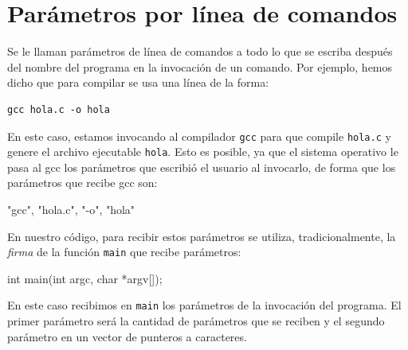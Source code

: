
%

\renewcommand{\chaptermark}[1]{\markboth{#1}{}}
\renewcommand{\thesection}{\arabic{section}}
\chapter*{Parámetros por línea de comandos}

Se le llaman parámetros de línea de comandos a todo lo que se escriba después
del nombre del programa en la invocación de un comando. Por ejemplo, hemos
dicho que para compilar se usa una línea de la forma:

\begin{verbatim}
gcc hola.c -o hola
\end{verbatim}

En este caso, estamos invocando al compilador \verb!gcc! para que compile
\verb!hola.c! y genere el archivo ejecutable \verb!hola!. Esto es posible,
ya que el sistema operativo le pasa al gcc los parámetros que escribió el
usuario al invocarlo, de forma que los parámetros que recibe gcc son:

\begin{codigo-c-plano}
"gcc", "hola.c", "-o", "hola"
\end{codigo-c-plano}

En nuestro código, para recibir estos parámetros se utiliza, tradicionalmente,
la \textit{firma} de la función \lstinline!main! que recibe parámetros:

\begin{codigo-c-plano}
int main(int argc, char *argv[]);
\end{codigo-c-plano}

En este caso recibimos en \lstinline!main! los parámetros de la invocación
del programa.  El primer parámetro será la cantidad de parámetros que se
reciben y el segundo parámetro en un vector de punteros a caracteres.

